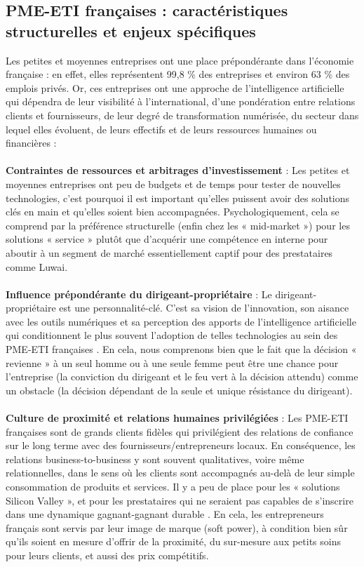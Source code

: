 \subsection{PME-ETI françaises : caractéristiques structurelles et enjeux spécifiques}

Les petites et moyennes entreprises ont une place prépondérante dans l'économie française : en effet, elles représentent 99,8 \% des entreprises et environ 63 \% des emplois privés. Or, ces entreprises ont une approche de l’intelligence artificielle qui dépendra de leur visibilité à l’international, d’une pondération entre relations clients et fournisseurs, de leur degré de transformation numérisée, du secteur dans lequel elles évoluent, de leurs effectifs et de leurs ressources humaines ou financières \cite{bpifrance2025ia, france_strategie2025make} :
\\\\
\textbf{Contraintes de ressources et arbitrages d'investissement} : Les petites et moyennes entreprises ont peu de budgets et de temps pour tester de nouvelles technologies, c’est pourquoi il est important qu’elles puissent avoir des solutions clés en main et qu’elles soient bien accompagnées. Psychologiquement, cela se comprend par la préférence structurelle (enfin chez les « mid-market ») pour les solutions « service » plutôt que d’acquérir une compétence en interne pour aboutir à un segment de marché essentiellement captif pour des prestataires comme Luwai.
\\\\
\textbf{Influence prépondérante du dirigeant-propriétaire} : Le dirigeant-propriétaire est une personnalité-clé. C’est sa vision de l’innovation, son aisance avec les outils numériques et sa perception des apports de l’intelligence artificielle qui conditionnent le plus souvent l’adoption de telles technologies au sein des PME-ETI françaises \cite{bpifrance2017dirigeants}. En cela, nous comprenons bien que le fait que la décision « revienne » à un seul homme ou à une seule femme peut être une chance pour l’entreprise (la conviction du dirigeant et le feu vert à la décision attendu) comme un obstacle (la décision dépendant de la seule et unique résistance du dirigeant).
\\\\
\textbf{Culture de proximité et relations humaines privilégiées} : Les PME-ETI françaises sont de grands clients fidèles qui privilégient des relations de confiance sur le long terme avec des fournisseurs/entrepreneurs locaux. En conséquence, les relations business-to-business y sont souvent qualitatives, voire même relationnelles, dans le sens où les clients sont accompagnés au-delà de leur simple consommation de produits et services. Il y a peu de place pour les « solutions Silicon Valley », et pour les prestataires qui ne seraient pas capables de s'inscrire dans une dynamique gagnant-gagnant durable \cite{sage2025pme_transformation}. En cela, les entrepreneurs français sont servis par leur image de marque (soft power), à condition bien sûr qu'ils soient en mesure d'offrir de la proximité, du sur-mesure aux petits soins pour leurs clients, et aussi des prix compétitifs.
